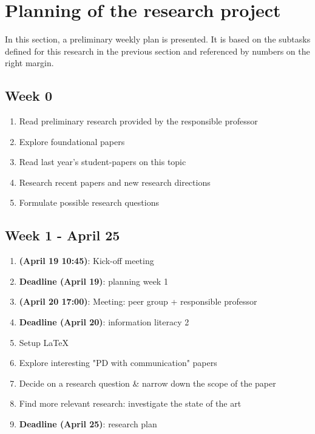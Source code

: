 \documentclass[english]{article}
\begin{document}
\section*{Planning of the research project}
In this section, a preliminary weekly plan is presented. It is based on the subtasks defined for this research in the previous section and referenced by numbers on the right margin.

\newcommand{\subtask}[1]{\hfill\textbf{(\ref{subtasks:#1})}}

\subsection*{Week 0}
\begin{enumerate}
\item Read preliminary research provided by the responsible professor
\item Explore foundational papers \citep{smaldino,Axelrod84}
\item Read last year's student-papers on this topic
\item Research recent papers and new research directions
\item Formulate possible research questions
\end{enumerate}

\subsection*{Week 1 - April 25}
\begin{enumerate}
\item \textbf{(April 19 10:45)}: Kick-off meeting
\item \textbf{Deadline (April 19)}: planning week 1
\item \textbf{(April 20 17:00)}: Meeting: peer group + responsible professor
\item \textbf{Deadline (April 20)}: information literacy 2
\item Setup \LaTeX
\item Explore interesting "PD with communication" papers
\item Decide on a research question \& narrow down the scope of the paper
\item Find more relevant research: investigate the state of the art
\item \textbf{Deadline (April 25)}: research plan
\end{enumerate}
\end{document}
